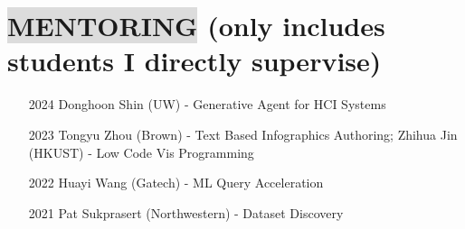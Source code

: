 \section*{
    \colorbox{gainsboro}{MENTORING}  {\small \normalfont (only includes students I directly supervise)}
}
\begin{itemize}[leftmargin=16.5mm,labelsep=9mm,noitemsep]
    \item[2024] Donghoon Shin (UW) - Generative Agent for HCI Systems
    \item[2023] Tongyu Zhou (Brown) - Text Based Infographics Authoring; Zhihua Jin (HKUST) - Low Code Vis Programming
    \item[2022] Huayi Wang (Gatech) - ML Query Acceleration
    \item[2021] Pat Sukprasert (Northwestern) - Dataset Discovery
\end{itemize}